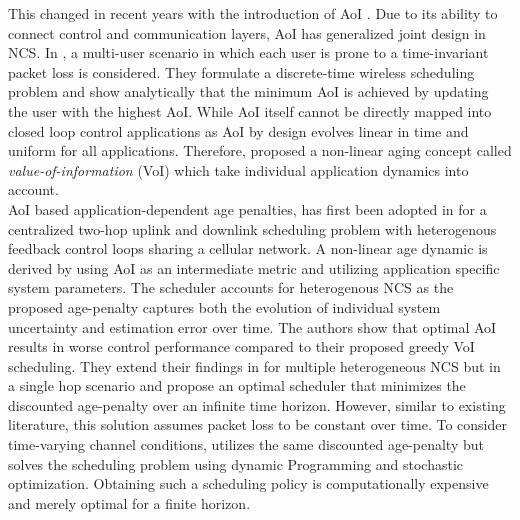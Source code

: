 This changed in recent years with the introduction of AoI \cite{kaul2012real}.
Due to its ability to connect control and communication layers, AoI has
generalized joint design in NCS. In \cite{kadota2018scheduling}, a multi-user
scenario in which each user is prone to a time-invariant packet loss is
considered. They formulate a discrete-time wireless scheduling problem and show
analytically that the minimum AoI is achieved by updating the user with the
highest AoI. While AoI itself cannot be directly mapped into closed loop control
applications as AoI by design evolves linear in time and uniform for all
applications. Therefore, \cite{kosta2017age} proposed a non-linear aging concept
called \textit{value-of-information} (VoI) which take individual application
dynamics into account. \\
AoI based application-dependent age penalties, has first been adopted in
\cite{ayan2019age} for a centralized two-hop uplink and downlink scheduling
problem with heterogenous feedback control loops sharing a cellular network. A
non-linear age dynamic is derived by using AoI as an intermediate metric and
utilizing application specific system parameters. The scheduler accounts for
heterogenous NCS as the proposed age-penalty captures both the evolution of
individual system uncertainty and estimation error over time. The authors show
that optimal AoI results in worse control performance compared to their proposed
greedy VoI scheduling. They extend their findings in \cite{ayan2020optimal} for
multiple heterogeneous NCS but in a single hop scenario and propose an optimal
scheduler that minimizes the discounted age-penalty over an infinite time
horizon. However, similar to existing literature, this solution assumes packet
loss to be constant over time. To consider time-varying channel conditions,
\cite{ayan2020aoi} utilizes the same discounted age-penalty but solves the
scheduling problem using dynamic Programming and stochastic optimization.
Obtaining such a scheduling policy is computationally expensive and merely
optimal for a finite horizon.


